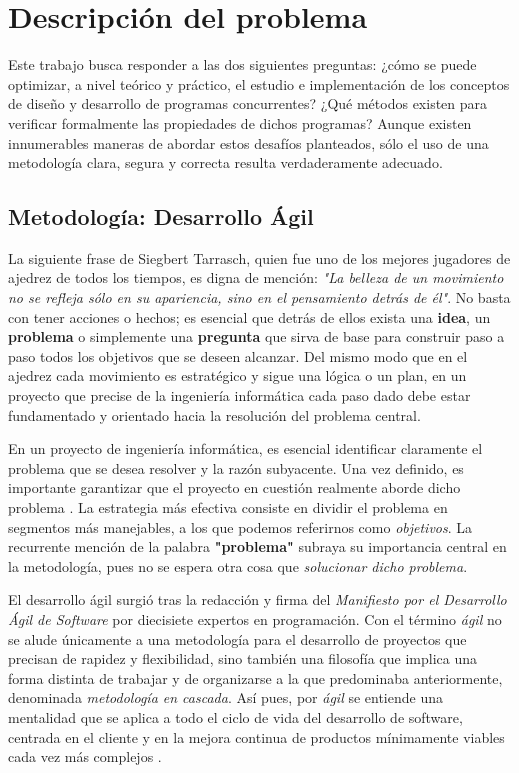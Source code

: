 \chapter{\textbf{Descripción del problema}}\label{chapter:problema}

Este trabajo busca responder a las dos siguientes preguntas: ¿cómo se puede optimizar, a nivel teórico y práctico, el estudio e implementación de los conceptos de diseño y desarrollo de programas concurrentes? ¿Qué métodos existen para verificar formalmente las propiedades de dichos programas? Aunque existen innumerables maneras de abordar estos desafíos planteados, sólo el uso de una metodología clara, segura y correcta resulta verdaderamente adecuado.

\section{Metodología: Desarrollo Ágil}
La siguiente frase de Siegbert Tarrasch, quien fue uno de los mejores jugadores de ajedrez de todos los tiempos, es digna de mención: \textit{"La belleza de un movimiento no se refleja sólo en su apariencia, sino en el pensamiento detrás de él"}. No basta con tener acciones o hechos; es esencial que detrás de ellos exista una \textbf{idea}, un \textbf{problema} o simplemente una \textbf{pregunta} que sirva de base para construir paso a paso todos los objetivos que se deseen alcanzar. Del mismo modo que en el ajedrez cada movimiento es estratégico y sigue una lógica o un plan, en un proyecto que precise de la ingeniería informática cada paso dado debe estar fundamentado y orientado hacia la resolución del problema central.

En un proyecto de ingeniería informática, es esencial identificar claramente el problema que se desea resolver y la razón subyacente. Una vez definido, es importante garantizar que el proyecto en cuestión realmente aborde dicho problema \cite{jj-agile-objetivos}. La estrategia más efectiva consiste en dividir el problema en segmentos más manejables, a los que podemos referirnos como \textit{objetivos}. La recurrente mención de la palabra \textbf{"problema"} subraya su importancia central en la metodología, pues no se espera otra cosa que \textit{solucionar dicho problema}.

El desarrollo ágil surgió tras la redacción y firma del \textit{Manifiesto por el Desarrollo Ágil de Software} \cite{agile-manifest} por diecisiete expertos en programación. Con el término \textit{ágil} no se alude únicamente a una metodología para el desarrollo de proyectos que precisan de rapidez y flexibilidad, sino también una filosofía que implica una forma distinta de trabajar y de organizarse a la que predominaba anteriormente, denominada \textit{metodología en cascada}. Así pues, por \textit{ágil} se entiende una mentalidad que se aplica a todo el ciclo de vida del desarrollo de software, centrada en el cliente y en la mejora continua de productos mínimamente viables cada vez más complejos \cite{jj-agile-manifesto}.

